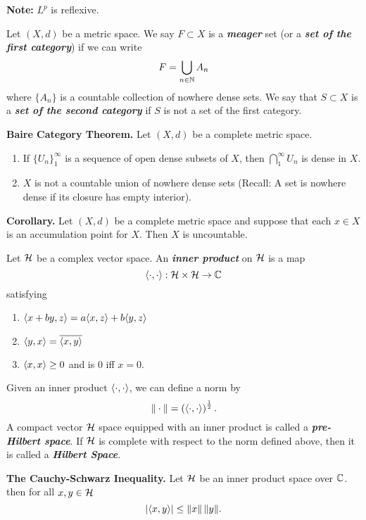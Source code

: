 \vs

\textbf{Note:} $L^p$ is reflexive.

\vs

\dfn Let $(X,d)$ be a metric space. We say $F\subset X$ is a \textit{\textbf{meager}} set (or a \textbf{\textit{set of the first category}}) if we can write 
\[F = \bigcup_{n\in \mathbb{N}}A_n\]
where $\{A_n\}$ is a countable collection of nowhere dense sets. We say that $S\subset X$ is a \textbf{\textit{set of the second category}} if $S$ is not a set of the first category.

\vs

\textbf{Baire Category Theorem.} Let $(X,d)$ be a complete metric space. 
\begin{enumerate}
    \item If $\{U_n\}_1^\infty$ is a sequence of open dense subsets of $X$, then $\bigcap_1^\infty U_n$ is dense in $X$.
    \item $X$ is not a countable union of nowhere dense sets (Recall: A set is nowhere dense if its closure has empty interior).
\end{enumerate}

\vs

\textbf{Corollary.} Let $(X, d)$ be a complete metric space and suppose that each $x\in X$ is an accumulation point for $X$. Then $X$ is uncountable.

\vs

\dfn Let $\mathcal{H}$ be a complex vector space. An \textbf{\textit{inner product}} on $\mathcal{H}$ is a map 
\[\langle\cdot,\cdot\rangle:\mathcal{H}\times\mathcal{H}\rightarrow\mathbb{C}\]
satisfying
\begin{enumerate}
    \item $\langle x + by,z\rangle = a\langle x,z\rangle + b\langle y,z\rangle$
    \item $\langle y,x\rangle = \overline{\langle x,y\rangle}$
    \item $\langle x,x\rangle \geq 0$ and is 0 iff $x = 0$.
\end{enumerate}
Given an inner product $\langle \cdot,\cdot\rangle$, we can define a norm by 
\[\|\cdot\| = \left(\langle \cdot,\cdot\rangle\right)^\frac{1}{2}.\]
A compact vector $\mathcal{H}$ space equipped with an inner product is called a \textbf{\textit{pre-Hilbert space}}. If $\mathcal{H}$ is complete with respect to the norm defined above, then it is called a \textbf{\textit{Hilbert Space}}.

\vs

\textbf{The Cauchy-Schwarz Inequality.} Let $\mathcal{H}$ be an inner product space over $\mathbb{C}$. then for all $x,y\in \mathcal{H}$
\[|\langle x,y\rangle| \leq \|x\|\,\|y\|.\]

